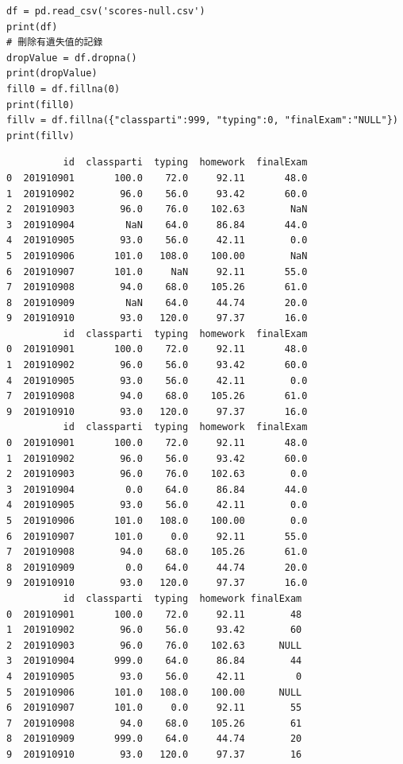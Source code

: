 \documentclass[a4paper,12pt]{article}
\begin{document}
\begin{enumerate}
\begin{lstlisting}
df = pd.read_csv('scores-null.csv')
print(df)
# 刪除有遺失值的記錄
dropValue = df.dropna()
print(dropValue)
fill0 = df.fillna(0)
print(fill0)
fillv = df.fillna({"classparti":999, "typing":0, "finalExam":"NULL"})
print(fillv)
\end{lstlisting}

\begin{verbatim}
          id  classparti  typing  homework  finalExam
0  201910901       100.0    72.0     92.11       48.0
1  201910902        96.0    56.0     93.42       60.0
2  201910903        96.0    76.0    102.63        NaN
3  201910904         NaN    64.0     86.84       44.0
4  201910905        93.0    56.0     42.11        0.0
5  201910906       101.0   108.0    100.00        NaN
6  201910907       101.0     NaN     92.11       55.0
7  201910908        94.0    68.0    105.26       61.0
8  201910909         NaN    64.0     44.74       20.0
9  201910910        93.0   120.0     97.37       16.0
          id  classparti  typing  homework  finalExam
0  201910901       100.0    72.0     92.11       48.0
1  201910902        96.0    56.0     93.42       60.0
4  201910905        93.0    56.0     42.11        0.0
7  201910908        94.0    68.0    105.26       61.0
9  201910910        93.0   120.0     97.37       16.0
          id  classparti  typing  homework  finalExam
0  201910901       100.0    72.0     92.11       48.0
1  201910902        96.0    56.0     93.42       60.0
2  201910903        96.0    76.0    102.63        0.0
3  201910904         0.0    64.0     86.84       44.0
4  201910905        93.0    56.0     42.11        0.0
5  201910906       101.0   108.0    100.00        0.0
6  201910907       101.0     0.0     92.11       55.0
7  201910908        94.0    68.0    105.26       61.0
8  201910909         0.0    64.0     44.74       20.0
9  201910910        93.0   120.0     97.37       16.0
          id  classparti  typing  homework finalExam
0  201910901       100.0    72.0     92.11        48
1  201910902        96.0    56.0     93.42        60
2  201910903        96.0    76.0    102.63      NULL
3  201910904       999.0    64.0     86.84        44
4  201910905        93.0    56.0     42.11         0
5  201910906       101.0   108.0    100.00      NULL
6  201910907       101.0     0.0     92.11        55
7  201910908        94.0    68.0    105.26        61
8  201910909       999.0    64.0     44.74        20
9  201910910        93.0   120.0     97.37        16
\end{verbatim}
\end{enumerate}
\end{document}
